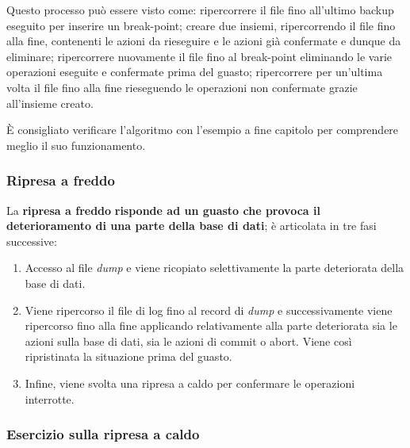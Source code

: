 \documentclass[a4paper]{article}
\begin{document}
	Questo processo può essere visto come: ripercorrere il file fino all'ultimo backup eseguito per inserire un break-point; creare due insiemi, ripercorrendo il file fino alla fine, contenenti le azioni da rieseguire e le azioni già confermate e dunque da eliminare; ripercorrere nuovamente il file fino al break-point eliminando le varie operazioni eseguite e confermate prima del guasto; ripercorrere per un'ultima volta il file fino alla fine rieseguendo le operazioni non confermate grazie all'insieme creato.\newline
	
	\noindent
	È consigliato verificare l'algoritmo con l'esempio a fine capitolo per comprendere meglio il suo funzionamento.\newpage
	
	\subsubsection{Ripresa a freddo}
	
	La \textcolor{Red3}{\textbf{ripresa a freddo}} \textbf{risponde ad un guasto che provoca il deterioramento di una parte della base di dati}; è articolata in tre fasi successive:
	\begin{enumerate}
		\item Accesso al file \emph{dump} e viene ricopiato selettivamente la parte deteriorata della base di dati.
		
		\item Viene ripercorso il file di log fino al record di \emph{dump} e successivamente viene ripercorso fino alla fine applicando relativamente alla parte deteriorata sia le azioni sulla base di dati, sia le azioni di commit o abort. Viene così ripristinata la situazione prima del guasto.
		
		\item Infine, viene svolta una ripresa a caldo per confermare le operazioni interrotte.
	\end{enumerate}\newpage
	
	\subsubsection{Esercizio sulla ripresa a caldo}
	
\end{document}
